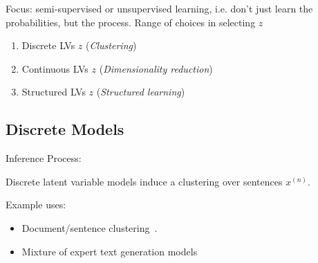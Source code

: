 \begin{frame}
    Focus: semi-supervised or unsupervised learning, i.e. don't just learn the probabilities, but the process.
    \vspace{0.5cm}
    \pause
    Range of choices in selecting $z$ 
    \begin{enumerate}
        \item Discrete LVs $z$ (\textit{Clustering})
        \item Continuous LVs $z$ (\textit{Dimensionality reduction})
        \item Structured LVs $z$ (\textit{Structured learning})
    \end{enumerate}
    
    \vspace{0.5cm}
\end{frame}


\subsection{Discrete Models}
\begin{frame}

Inference Process: 

\begin{center}
\end{center}
\pause


Discrete latent variable models induce a clustering over sentences $x^{(n)}$. 
\air 

Example uses: 

 \begin{itemize}
     \item Document/sentence clustering~\citep{willett1988recent,aggarwal2012survey}.
     \item Mixture of expert text generation models~\citep{jacobs1991adaptive,garmash2016ensemble,lee2016stochastic}
 \end{itemize}

\end{frame}

